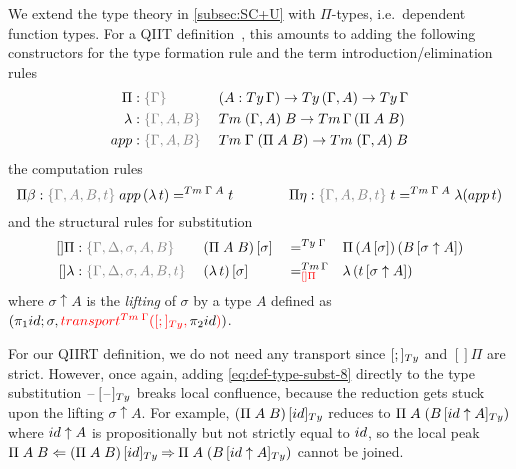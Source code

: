\documentclass[a4paper,UKenglish,numberwithinsect,cleveref,thm-restate]{lipics-v2021}
\begin{document}
We extend the type theory in \cref{subsec:SC+U} with $\Pi$-types, i.e.\ dependent function types. %
For a QIIT definition~\cite{Altenkirch2016a}, this amounts to adding the following constructors for the type formation rule and the term introduction/elimination rules
\begin{alignat*}{3}
  \Pi     &: \implicit{\Gamma}           \; && (A : \Ty\,\Gamma) \to \Ty\,(\Gamma, A) \to \Ty\,\Gamma \\
  \lambda &: \implicit{\Gamma, A, B}     \; && \Tm\;(\Gamma, A)\;B \to \Tm\,\Gamma\,(\Pi\;A\;B) \\
  \mathsf{app} &: \implicit{\Gamma, A, B}\; && \Tm\;\Gamma\;(\Pi\;A\;B) \to \Tm\;(\Gamma, A)\;B
\end{alignat*}
the computation rules
\[
  \Pi\beta           : \implicit{\Gamma, A, B, t}\; \mathsf{app}\,(\lambda\,t) =^{\Tm\;\Gamma\;A} t
  \qquad\qquad
  \Pi\eta            : \implicit{\Gamma, A, B, t}\; t                         =^{\Tm\;\Gamma\;A} \lambda(\mathsf{app}\,t)
\]
and the structural rules for substitution
\begin{alignat}{5}
  []\Pi              & : \implicit{\Gamma, \Delta, \sigma, A, B}\;    && \sub{(\Pi\;A\;B)}{\sigma} && =^{\Ty\;\Gamma} && \Pi\,(\sub{A}{\sigma})\,(\sub{B}{\sigma\uparrow A}) \label{eq:def-type-subst-8} \\
  \mathsf{[]\lambda} & : \implicit{\Gamma, \Delta, \sigma, A, B, t}\; && \sub{(\lambda\,t)}{\sigma} && =^{\Tm\,\Gamma}_{\alert{[]\Pi}} && \lambda\,(\sub{t}{\sigma \uparrow A}) \nonumber
\end{alignat}
where $\sigma \uparrow A$ is the \emph{lifting}  of $\sigma$ by a type $A$ defined as $(\pi_1\idS; \sigma, \alert{\transfib{\Tm\;\Gamma}{[;]_{\Ty}}{\color{black}\pi_2\idS}})$. 

For our QIIRT definition, %
we do not need any transport since $[;]_{\Ty}$ and $[]\Pi$ are strict.
However, once again, adding \eqref{eq:def-type-subst-8} directly to the type substitution $\subTy{\blank}{\blank}$ breaks local confluence, because the reduction gets stuck upon the lifting $\sigma \uparrow A$.
For example, $\subTy{(\Pi\;A\;B)}{\idS}$ reduces to $\Pi\;A\;(\subTy{B}{\idS \uparrow A})$ where $\idS \uparrow A$ is propositionally but not strictly equal to $\idS$, so the local peak $\Pi\;A\;B \Leftarrow \subTy{(\Pi\;A\;B)}{\idS} \reduce \Pi\;A\;(\subTy{B}{\idS \uparrow A})$ cannot be joined. 
\end{document}
